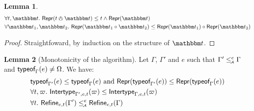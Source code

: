 \documentclass[a4paper]{article}
\theoremstyle{definition}
\newtheorem{lemma}{Lemma}
\begin{document}
  \begin{lemma}
    \begin{align*}
      &\forall t,\ts.\ \tsrep{t\tsand\ts} \leq t \land \tsrep{\ts}\\
      &\forall \ts_1,\ts_2.\ \tsrep{\apply {\ts_1}{\ts_2}} \leq \apply {\tsrep {\ts_1}}{\tsrep {\ts_2}}
    \end{align*}
  \end{lemma}

  \begin{proof}
    Straightfoward, by induction on the structure of $\ts$.
  \end{proof}

  \begin{lemma}[Monotonicity of the algorithm] Let $\Gamma$, $\Gamma'$ and $e$ such that $\Gamma'\leq_{\!\scriptscriptstyle\mathcal{A}}^e \Gamma$ and $\textsf{typeof}_{\Gamma}(e) \neq \Omega$. We have:
    \begin{align*}
      &\textsf{typeof}_{\Gamma'}(e) \leq \textsf{typeof}_{\Gamma}(e) \text{ and } \textsf{Repr}(\textsf{typeof}_{\Gamma'}(e)) \leq \textsf{Repr}(\textsf{typeof}_{\Gamma}(e))\\
      &\forall t,\varpi.\ \textsf{Intertype}_{\Gamma',e,t} (\varpi) \leq \textsf{Intertype}_{\Gamma,e,t} (\varpi)\\
      &\forall t.\ \textsf{Refine}_{e,t}(\Gamma') \leq_{\!\scriptscriptstyle\mathcal{A}}^e \textsf{Refine}_{e,t}(\Gamma)\\
    \end{align*}
  \end{lemma}
\end{document}
